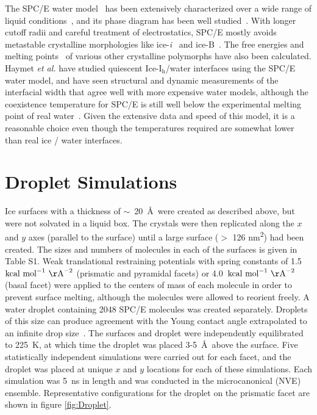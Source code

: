 \documentclass{pnastwo}
\begin{document}
\begin{article}
The SPC/E water model~\cite{Berendsen87} has been extensively
characterized over a wide range of liquid
conditions~\cite{Arbuckle02,Kuang12}, and its phase diagram has been
well studied~\cite{Baez95,Bryk04b,Sanz04b,Fennell:2005fk}. With longer
cutoff radii and careful treatment of electrostatics, SPC/E mostly
avoids metastable crystalline morphologies like
ice-\textit{i}~\cite{Fennell:2005fk} and ice-B~\cite{Baez95}.  The
free energies and melting
points~\cite{Baez95,Arbuckle02,Gay02,Bryk02,Bryk04b,Sanz04b,Fennell:2005fk,Fernandez06,Abascal07,Vrbka07}
of various other crystalline polymorphs have also been calculated.
Haymet \textit{et al.} have studied quiescent Ice-I$_\mathrm{h}$/water
interfaces using the SPC/E water model, and have seen structural and
dynamic measurements of the interfacial width that agree well with
more expensive water models, although the coexistence temperature for
SPC/E is still well below the experimental melting point of real
water~\cite{Bryk02}. Given the extensive data and speed of this model,
it is a reasonable choice even though the temperatures required are
somewhat lower than real ice / water interfaces.

\section{Droplet Simulations}
Ice surfaces with a thickness of $\sim$~20~\AA\ were created as
described above, but were not solvated in a liquid box. The crystals
were then replicated along the $x$ and $y$ axes (parallel to the
surface) until a large surface ($>$ 126 nm\textsuperscript{2}) had
been created.  The sizes and numbers of molecules in each of the
surfaces is given in Table S1.  Weak translational restraining
potentials with spring constants of 1.5~$\mathrm{kcal\
  mol}^{-1}\mathrm{~\AA}^{-2}$ (prismatic and pyramidal facets) or
4.0~$\mathrm{kcal\ mol}^{-1}\mathrm{~\AA}^{-2}$ (basal facet) were
applied to the centers of mass of each molecule in order to prevent
surface melting, although the molecules were allowed to reorient
freely. A water droplet containing 2048 SPC/E molecules was created
separately. Droplets of this size can produce agreement with the Young
contact angle extrapolated to an infinite drop size~\cite{Daub10}. The
surfaces and droplet were independently equilibrated to 225~K, at
which time the droplet was placed 3-5~\AA\ above the surface.  Five
statistically independent simulations were carried out for each facet,
and the droplet was placed at unique $x$ and $y$ locations for each of
these simulations.  Each simulation was 5~ns in length and was
conducted in the microcanonical (NVE) ensemble.  Representative
configurations for the droplet on the prismatic facet are shown in
figure \ref{fig:Droplet}.


\end{article}
\end{document}

